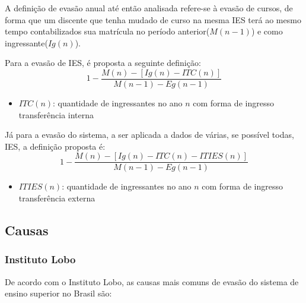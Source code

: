 \documentclass{report}
\begin{document}
A definição de evasão anual até então analisada refere-se à evasão de cursos, de forma que um discente que tenha mudado de curso na mesma IES terá ao mesmo tempo contabilizados sua matrícula no período anterior($M(n-1)$) e como ingressante($Ig(n)$).

Para a evasão de IES, é proposta a seguinte definição:
\begin{equation}
1 - \frac{M(n) - [Ig(n) - ITC(n)]}{M(n-1) - Eg(n-1)}
\end{equation}
\begin{itemize}
\item $ITC(n)$: quantidade de ingressantes no ano $n$ com forma de ingresso transferência interna
\end{itemize}

Já para a evasão do sistema, a ser aplicada a dados de várias, se possível todas, IES, a definição proposta é:
\begin{equation}
1 - \frac{M(n) - [Ig(n) - ITC(n) - ITIES(n)]}{M(n-1) - Eg(n-1)}
\end{equation}
\begin{itemize}
\item $ITIES(n)$: quantidade de ingressantes no ano $n$ com forma de ingresso transferência externa
\end{itemize}


\subsection{Causas}

\subsubsection{Instituto Lobo}
De acordo com o Instituto Lobo\cite{evasao_panorama2}, as causas mais comuns de evasão do sistema de ensino superior no Brasil são:
\end{document}
